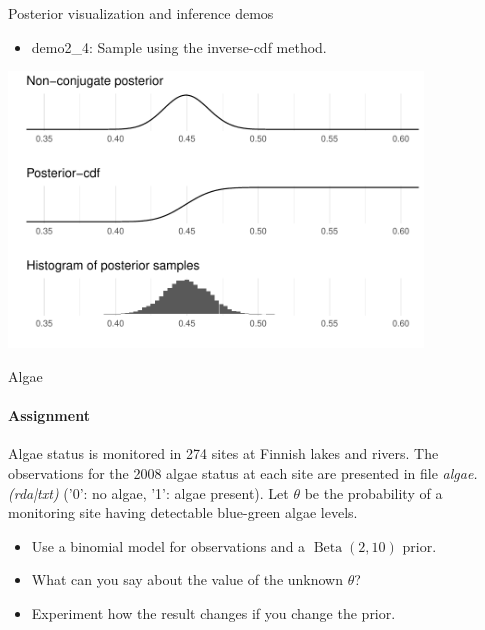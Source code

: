 \documentclass[english,t]{beamer}
\DeclareMathOperator{\Beta}{Beta}
\begin{document}
\begin{frame}{Posterior visualization and inference demos}

  \begin{itemize}
  \item demo2\_4: Sample using the inverse-cdf method.
  \end{itemize}
  \includegraphics[width=11cm]{figs/demo2_4b.pdf}
\end{frame}

\begin{frame}{Algae}
  \framesubtitle{Assignment}

  Algae status is monitored in 274 sites at Finnish lakes and rivers. 
  The observations for the 2008 algae status at each site are presented
  in file \emph{algae.(rda|txt)} ('0': no algae, '1': algae present). 
  Let $\theta$ be the probability of a monitoring site having detectable
  blue-green algae levels. 

  \begin{itemize}
  \item Use a binomial model for observations and a $\Beta(2,10)$ prior.
  \item What can you say about the value of the unknown $\theta$?
  \item Experiment how the result changes if you change the prior.
  \end{itemize}

\end{frame}
\end{document}
